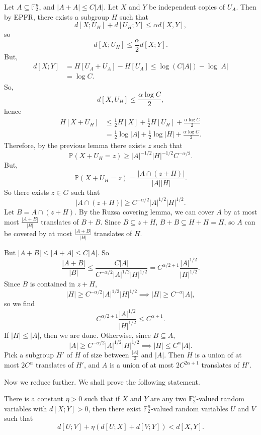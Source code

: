 \documentclass[12pt]{article}
\begin{document}
\begin{proofbox}
	Let $A \subseteq \mathbb{F}_2^{n}$, and $|A + A| \leq C |A|$. Let $X$ and $Y$ be independent copies of $U_A$. Then by EPFR, there exists a subgroup $H$ such that
	\[
		d[X; U_H] + d[U_H; Y] \leq \alpha d[X, Y],
	\]
	so
	\[
		d[X; U_H] \leq \frac{\alpha}{2} d[X; Y].
	\]
	But,
	\begin{align*}
		d[X; Y] &= H[U_A + U_A] - H[U_A] \leq \log(C|A|) - \log |A| \\
			&= \log C.
	\end{align*}
	So,
	\[
	d[X, U_H] \leq \frac{\alpha \log C}{2},
	\]
	hence
	\begin{align*}
		H[X + U_H] &\leq \frac12 H[X] + \frac 12 H[U_H] + \frac{\alpha \log C}2 \\
			   &= \frac 12 \log |A| + \frac 12 \log |H| + \frac{\alpha \log C}2.
	\end{align*}
	Therefore, by the previous lemma there exists $z$ such that
	\[
	\mathbb{P}(X + U_H = z) \geq |A|^{-1/2} |H|^{-1/2} C^{-\alpha/2}.
	\]
	But,
	\[
	\mathbb{P}(X + U_H = z) = \frac{|A \cap (z + H)|}{|A| |H|}.
	\]
	So there exists $z \in G$ such that
	\[
	|A \cap (z + H)| \geq C^{-\alpha/2} |A|^{1/2} |H|^{1/2}.
	\]
	Let $B = A \cap (z + H)$. By the Ruzsa covering lemma, we can cover $A$ by at most most $\frac{|A + B|}{|B|}$ translates of $B + B$. Since $B \subseteq z + H$, $B + B \subseteq H + H = H$, so $A$ can be covered by at most $\frac{|A + B|}{|H|}$ translates of $H$.

	But $|A + B| \leq |A + A| \leq C|A|$. So
	\[
	\frac{|A + B|}{|B|} \leq \frac{C|A|}{C^{-\alpha/2} |A|^{1/2} |H|^{1/2}} = C^{\alpha/2 + 1} \frac{|A|^{1/2}}{|H|^{1/2}}.
	\]
	Since $B$ is contained in $z + H$,
	\[
	|H| \geq C^{-\alpha/2} |A|^{1/2} |H|^{1/2} \implies |H| \geq C^{-\alpha} |A|,
	\]
	so we find
	\[
	C^{\alpha/2 + 1} \frac{|A|^{1/2}}{|H|^{1/2}} \leq C^{\alpha + 1}.
	\]
	If $|H| \leq |A|$, then we are done. Otherwise, since $B \subseteq A$,
	\[
	|A| \geq C^{-\alpha/2} |A|^{1/2} |H|^{1/2} \implies |H| \leq C^{\alpha}|A|.
	\]
	Pick a subgroup $H'$ of $H$ of size between $\frac{|A|}{2}$ and $|A|$. Then $H$ is a union of at most $2C^{\alpha}$ translates of $H'$, and $A$ is a union of at most $2C^{2\alpha + 1}$ translates of $H'$.
\end{proofbox}

Now we reduce further. We shall prove the following statement.

\begin{theorem}[EPFR']
	There is a constant $\eta > 0$ such that if $X$ and $Y$ are any two $\mathbb{F}_2^{n}$-valued random variables with $d[X; Y] > 0$, then there exist $\mathbb{F}_2^{n}$-valued random variables $U$ and $V$ such that
	\[
		d[U; V] + \eta(d[U; X] + d[V; Y]) < d[X, Y].
	\]
\end{theorem}
\end{document}
